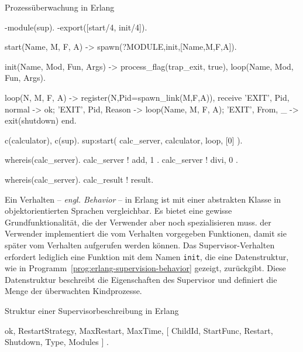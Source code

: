 \begin{program}[!hbt]
\caption{Prozessüberwachung in Erlang}
\label{prog:erlang-supervision}
\noindent\begin{minipage}[t]{.52\textwidth}
\lstset{showlines=true}
\begin{ErlangCode}
-module(sup).
-export([start/4, init/4]).

start(Name, M, F, A) ->
  spawn(?MODULE,init,[Name,M,F,A]).

init(Name, Mod, Fun, Args) ->
  process_flag(trap_exit, true),
  loop(Name, Mod, Fun, Args).

loop(N, M, F, A) ->
  register(N,Pid=spawn_link(M,F,A)),
  receive
    { 'EXIT', Pid, normal } -> ok;
    { 'EXIT', Pid, Reason } -> 
      loop(Name, M, F, A);
    { 'EXIT', From, _ } -> 
			exit(shutdown)
  end.
\end{ErlangCode}

\end{minipage}\hfill
\begin{minipage}[t]{.44\textwidth}
\lstset{showlines=true}
\begin{ErlangCode}
c(calculator), c(sup).
sup:start(
  calc_server, 
  calculator, loop, [0]
).

whereis(calc_server).
calc_server ! { add,  1 }.
calc_server ! { divi, 0 }.

whereis(calc_server). 
calc_result ! result.
\end{ErlangCode}

\end{minipage}
\end{program}

Ein Verhalten -- \textit{engl. Behavior} -- in Erlang ist mit einer abstrakten Klasse in objektorientierten Sprachen vergleichbar. Es bietet eine gewisse Grundfunktionalität, die der Verwender aber noch spezialisieren muss. \Dah der Verwender implementiert die vom Verhalten vorgegeben Funktionen, damit sie später vom Verhalten aufgerufen werden können. Das Supervisor-Verhalten erfordert lediglich eine Funktion mit dem Namen \lstinline{init}, die eine Datenstruktur, wie in Programm~\ref{prog:erlang-supervision-behavior} gezeigt, zurückgibt. Diese Datenstruktur beschreibt die Eigenschaften des Supervisor und definiert die Menge der überwachten Kindprozesse.

\begin{program}[!hbt]
\caption{Struktur einer Supervisorbeschreibung in Erlang}
\label{prog:erlang-supervision-behavior}
\begin{ErlangCode}
{ ok, 
  { {RestartStrategy, MaxRestart, MaxTime},
	  [ {ChildId, StartFunc, Restart, Shutdown, Type, Modules} ] } }.
\end{ErlangCode}
\end{program}

